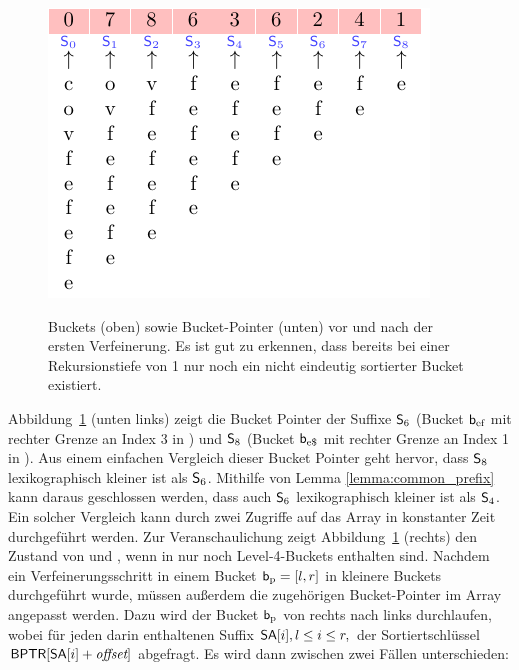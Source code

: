 \begin{figure}[ht]
{		\hspace{1em}
		\includegraphics[valign=t]{kapitel/saca_algorithmen/bpr/algorithmus/phase2/bptr_updated/image.pdf}
	}
	\caption[Buckets sowie Bucket-Pointer vor und nach der ersten Verfeinerung]{Buckets (oben) sowie Bucket-Pointer (unten) vor und nach der ersten Verfeinerung. Es ist gut zu erkennen, dass bereits bei einer Rekursionstiefe von 1 nur noch ein nicht eindeutig sortierter Bucket existiert.}
	\label{fig:buckets_compare_and_sort}
\end{figure}
Abbildung~\ref{fig:buckets_compare_and_sort} (unten links) zeigt die Bucket Pointer der Suffixe \(\mathsf{S}_{6}\) (Bucket \(\mathsf{b}_{\textup{ef}}\) mit rechter Grenze an Index 3 in \sa) und \(\mathsf{S}_{8}\) (Bucket \(\mathsf{b}_{\textup{e\$}}\) mit rechter Grenze an Index 1 in \sa). Aus einem einfachen Vergleich dieser Bucket Pointer geht hervor, dass \(\mathsf{S}_{8}\) lexikographisch kleiner ist als \(\mathsf{S}_{6}\). Mithilfe von Lemma \ref{lemma:common_prefix} kann daraus geschlossen werden, dass auch \(\mathsf{S}_{6}\) lexikographisch kleiner ist als \(\mathsf{S}_{4}\). Ein solcher Vergleich kann durch zwei Zugriffe auf das Array \bptr in konstanter Zeit durchgeführt werden. Zur Veranschaulichung zeigt Abbildung~\ref{fig:buckets_compare_and_sort} (rechts) den Zustand von \sa und \bptr, wenn in \sa nur noch Level-4-Buckets enthalten sind. Nachdem ein Verfeinerungsschritt in einem Bucket \(\mathsf{b}_{\textup{p}} = [l,r]\) in kleinere Buckets durchgeführt wurde, müssen außerdem die zugehörigen Bucket-Pointer im Array \bptr angepasst werden. Dazu wird der Bucket \(\mathsf{b}_{\textup{p}}\) von rechts nach links durchlaufen, wobei für jeden darin enthaltenen Suffix \(\sa[i], l \leq i \leq r,\) der Sortiertschlüssel \(\bptr[\sa[i]+\offset]\) abgefragt. Es wird dann zwischen zwei Fällen unterschieden:

